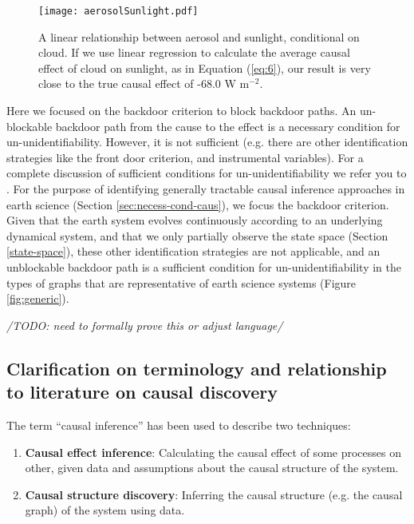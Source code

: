 \documentclass[12pt]{article}
\begin{document}
\begin{figure}
  \texttt{[image: aerosolSunlight.pdf]}
  \caption{A linear relationship between aerosol and sunlight,
    conditional on cloud. If we use linear regression to calculate the
    average causal effect of cloud on sunlight, as in Equation
    (\ref{eq:6}), our result is very close to the true causal effect
    of -68.0 W m$^{-2}$.}
  \label{fig:linear}
\end{figure}

Here we focused on the backdoor criterion to block backdoor paths. An
un-blockable backdoor path from the cause to the effect is a necessary
condition for un-unidentifiability. However, it is not sufficient
(e.g. there are other identification strategies like the front door
criterion, and instrumental variables). For a complete discussion of
sufficient conditions for un-unidentifiability we refer you to
\citet{shpitser2006}. For the purpose of identifying generally
tractable causal inference approaches in earth science (Section
\ref{sec:necess-cond-caus}), we focus the backdoor criterion. Given
that the earth system evolves continuously according to an underlying
dynamical system, and that we only partially observe the state space
(Section \ref{state-space}), these other identification strategies are
not applicable, and an unblockable backdoor path is a sufficient
condition for un-unidentifiability in the types of graphs that are
representative of earth science systems (Figure \ref{fig:generic}).

\textit{/TODO: need to formally prove this or adjust language/}

\subsection{Clarification on terminology and relationship to literature on causal discovery}
\label{sec:discovery}
The term ``causal inference'' has been used to describe two
techniques:

\begin{enumerate}
\item \textbf{Causal effect inference}: Calculating the causal effect
  of some processes on other, given data and assumptions about the
  causal structure of the system.
\item \textbf{Causal structure discovery}: Inferring the causal
  structure (e.g. the causal graph) of the system using data.
\end{enumerate}
\end{document}

